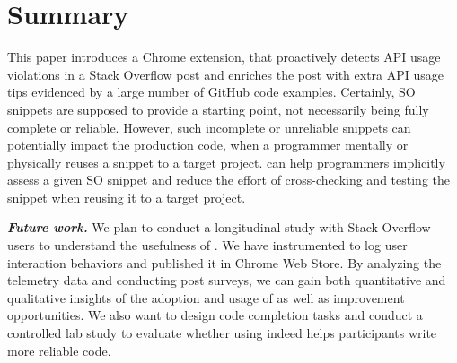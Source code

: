 \section{Summary}
\label{sec:summary}
This paper introduces a Chrome extension, {\tool} that proactively detects API usage violations in a Stack Overflow post and enriches the post with extra API usage tips evidenced by a large number of GitHub code examples. Certainly, SO snippets are supposed to provide a starting point, not necessarily being fully complete or reliable. However, such incomplete or unreliable snippets can potentially impact the production code, when a programmer mentally or physically reuses a snippet to a target project. {\tool} can help programmers implicitly assess a given SO snippet and reduce the effort of cross-checking and testing the snippet when reusing it to a target project. 

{\bf\em Future work.} We plan to conduct a longitudinal study with Stack Overflow users to understand the usefulness of {\tool}. We have instrumented {\tool} to log user interaction behaviors and published it in Chrome Web Store. By analyzing the telemetry data and conducting post surveys, we can gain both quantitative and qualitative insights of the adoption and usage of {\tool} as well as improvement opportunities. We also want to design code completion tasks and conduct a controlled lab study to evaluate whether using {\tool} indeed helps participants write more reliable code.